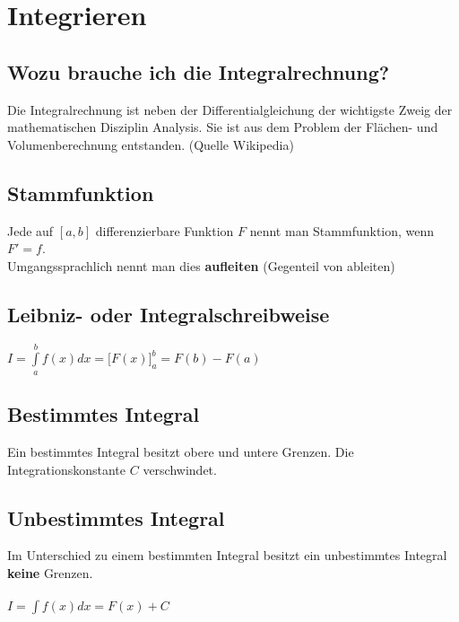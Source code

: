 
\section{Integrieren}

\subsection{Wozu brauche ich die Integralrechnung?}
Die Integralrechnung ist neben der Differentialgleichung der wichtigste Zweig der mathematischen Disziplin Analysis. Sie ist aus dem Problem der Flächen- und Volumenberechnung entstanden. (Quelle Wikipedia)

\subsection{Stammfunktion}
Jede auf $[a,b]$ differenzierbare Funktion $F$ nennt man Stammfunktion, wenn $F'= f$.\\
Umgangssprachlich nennt man dies \textbf{\grqq aufleiten\grqq} (Gegenteil von ableiten)

\subsection{Leibniz- oder Integralschreibweise}
\label{Leibniz}
$\displaystyle I = \int\limits_{a}^{b}{f(x)}d{x} = \bigl[F(x)\bigr]_a^b = F(b)-F(a)$

\subsection{Bestimmtes Integral}
Ein bestimmtes Integral besitzt obere und untere Grenzen. Die Integrationskonstante $C$ verschwindet.\\

\subsection{Unbestimmtes Integral}
Im Unterschied zu einem bestimmten Integral besitzt ein unbestimmtes Integral \textbf{keine} Grenzen.\\\\
$\displaystyle I = \int{f(x)}d{x} = F(x) + C$

